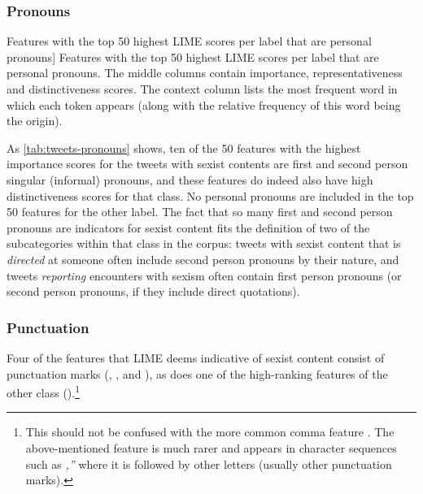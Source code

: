 \subsubsection{Pronouns}

\begin{table}[htbp]
    
    \caption
    [Features with the top 50 highest LIME scores per label that are personal pronouns]
    {Features with the top 50 highest LIME scores per label that are personal pronouns.
    The middle columns contain importance, representativeness and distinctiveness scores.
    The context column lists the most frequent word in which each token appears (along with the relative frequency of this word being the origin).
    }
    \label{tab:tweets-pronouns}
\end{table}

As \autoref{tab:tweets-pronouns} shows, ten of the 50 features with the highest importance scores for the tweets with sexist contents are first and second person singular (informal) pronouns, and these features do indeed also have high distinctiveness scores for that class.
No personal pronouns are included in the top 50 features for the other label.
The fact that so many first and second person pronouns are indicators for sexist content fits the definition of two of the subcategories within that class in the corpus: tweets with sexist content that is \textit{directed} at someone often include second person pronouns by their nature, and tweets \textit{reporting} encounters with sexism often contain first person pronouns (or second person pronouns, if they include direct quotations).

\subsubsection{Punctuation}

Four of the features that LIME deems indicative of sexist content consist of punctuation marks (, , \ngram{=\eow} and ), as does one of the high-ranking features of the other class (\ngram{,\mow}).\footnote{%
This should not be confused with the more common comma feature \ngram{,\eow}.
The above-mentioned feature is much rarer and appears in character sequences such as \textit{,''} where it is followed by other letters (usually other punctuation marks).
}
